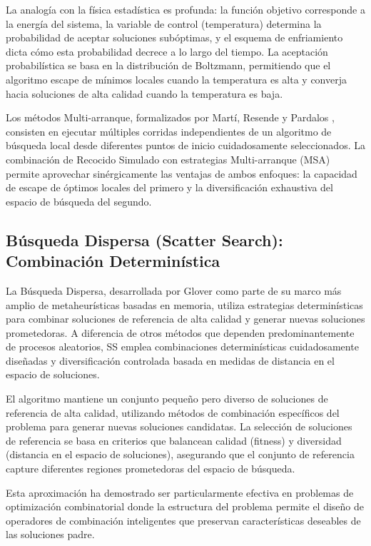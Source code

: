 La analogía con la física estadística es profunda: la función objetivo corresponde a la energía del sistema, la variable de control (temperatura) determina la probabilidad de aceptar soluciones subóptimas, y el esquema de enfriamiento dicta cómo esta probabilidad decrece a lo largo del tiempo. La aceptación probabilística se basa en la distribución de Boltzmann, permitiendo que el algoritmo escape de mínimos locales cuando la temperatura es alta y converja hacia soluciones de alta calidad cuando la temperatura es baja.

Los métodos Multi-arranque, formalizados por Martí, Resende y Pardalos \cite{marti2018multistart}, consisten en ejecutar múltiples corridas independientes de un algoritmo de búsqueda local desde diferentes puntos de inicio cuidadosamente seleccionados. La combinación de Recocido Simulado con estrategias Multi-arranque (MSA) permite aprovechar sinérgicamente las ventajas de ambos enfoques: la capacidad de escape de óptimos locales del primero y la diversificación exhaustiva del espacio de búsqueda del segundo.

\subsection{Búsqueda Dispersa (Scatter Search): Combinación Determinística}

La Búsqueda Dispersa, desarrollada por Glover \cite{glover1998template} como parte de su marco más amplio de metaheurísticas basadas en memoria, utiliza estrategias determinísticas para combinar soluciones de referencia de alta calidad y generar nuevas soluciones prometedoras. A diferencia de otros métodos que dependen predominantemente de procesos aleatorios, SS emplea combinaciones determinísticas cuidadosamente diseñadas y diversificación controlada basada en medidas de distancia en el espacio de soluciones.

El algoritmo mantiene un conjunto pequeño pero diverso de soluciones de referencia de alta calidad, utilizando métodos de combinación específicos del problema para generar nuevas soluciones candidatas. La selección de soluciones de referencia se basa en criterios que balancean calidad (fitness) y diversidad (distancia en el espacio de soluciones), asegurando que el conjunto de referencia capture diferentes regiones prometedoras del espacio de búsqueda.

Esta aproximación ha demostrado ser particularmente efectiva en problemas de optimización combinatorial donde la estructura del problema permite el diseño de operadores de combinación inteligentes que preservan características deseables de las soluciones padre.

